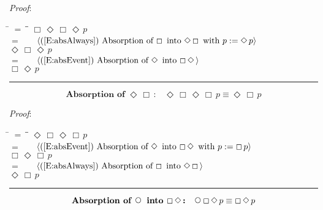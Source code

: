 \documentclass[12pt, fleqn, leqno]{article}
\newcommand{\lgap}{2pt}                             %
\newcommand{\mymathindent}{24pt}                    %
\newcommand{\Next}{\;\,\text{\raisebox{3.5pt}{\circle{6}}}}
\newcommand{\Event}{\Diamond\,}
\newcommand{\Always}{\Box\,}
\newcommand{\myqed}{\rule[-.23ex]{1.2ex}{2.0ex}}
\newcommand{\myqedtab}{\hspace{384pt}}              %
\newcommand{\Gll} {\langle}                         %
\newcommand{\Ggg} {\rangle}                         %
\newcommand{\Hint}[1]     {\ \ \ $\Gll              \mbox{#1} \Ggg$ }   %
\begin{document}
\emph{Proof}:
\begin{tabbing}
\hspace{\mymathindent} \= $= \;$ \= \myqedtab \= \kill
  \> \>   $\Always \Event\Always\Event p$\\[\lgap]
  \> $=$  \>  \Hint{(\ref{E:absAlways}) Absorption of $\Always$ into $\Event\Always$ with $p:=\Event p$}\\[\lgap]
  \> \>   $\Event \Always \Event p$\\[\lgap]
  \> $=$ \> \Hint{(\ref{E:absEvent}) Absorption of $\Event$ into $\Always\Event$}\\[\lgap]
  \> \>   $\Always\Event p$ \quad \myqed
\end{tabbing}
\begin{equation}\label{E:absEventAlways}
\textbf{Absorption of $\Event \Always$:}\quad \Event \Always \Event\Always p \equiv \Event\Always p
\end{equation}

\emph{Proof}:
\begin{tabbing}
\hspace{\mymathindent} \= $= \;$ \= \myqedtab \= \kill
  \> \>   $\Event \Always \Event\Always p$\\[\lgap]
  \> $=$  \>  \Hint{(\ref{E:absEvent}) Absorption of $\Event$ into $\Always\Event$ with $p:=\Always p$}\\[\lgap]
  \> \>   $\Always \Event \Always p$\\[\lgap]
  \> $=$ \> \Hint{(\ref{E:absAlways}) Absorption of $\Always$ into $\Event\Always$}\\[\lgap]
  \> \>   $\Event \Always p$ \quad \myqed
\end{tabbing}
\begin{equation}\label{E:absNextAlwaysEvent}
\textbf{Absorption of $\Next$ into $\Always\Event$:}\quad \Next\Always\Event p \equiv \Always\Event p
\end{equation}
\end{document}
